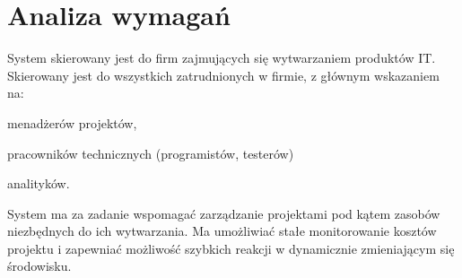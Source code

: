 \section{Analiza wymagań}
System skierowany jest do firm zajmujących się wytwarzaniem produktów IT. Skierowany jest do wszystkich zatrudnionych w firmie, z głównym wskazaniem na:
\begin{itemize*}
\item menadżerów projektów,
\item pracowników technicznych (programistów, testerów)
\item analityków.
\end{itemize*}
System ma za zadanie wspomagać zarządzanie projektami pod kątem zasobów niezbędnych do ich wytwarzania. Ma umożliwiać stałe monitorowanie kosztów projektu i zapewniać możliwość szybkich reakcji w dynamicznie zmieniającym się środowisku.
